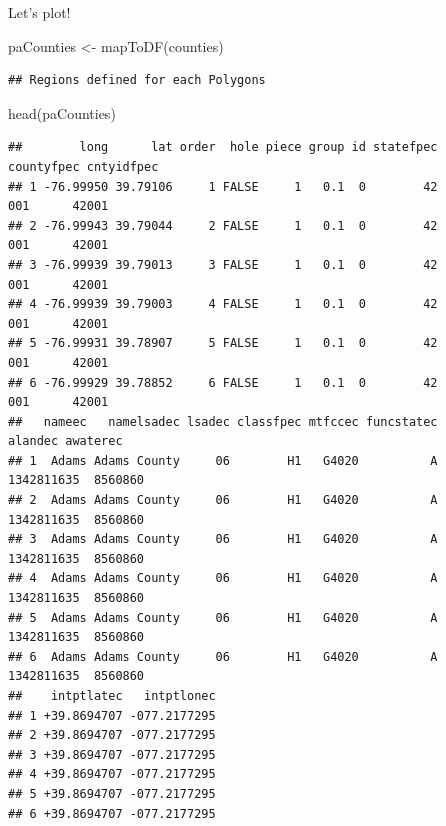 \documentclass[
  ignorenonframetext,
]{beamer}
\newenvironment{Shaded}{\begin{snugshade}}{\end{snugshade}}
\newcommand{\FunctionTok}[1]{\textcolor[rgb]{0.00,0.00,0.00}{#1}}
\newcommand{\NormalTok}[1]{#1}
\newcommand{\OtherTok}[1]{\textcolor[rgb]{0.56,0.35,0.01}{#1}}
\begin{document}
\begin{frame}[fragile]{Let's plot!}
\protect\hypertarget{lets-plot-1}{}
\tiny

\begin{Shaded}
\begin{Highlighting}[]
\NormalTok{paCounties }\OtherTok{\textless{}{-}} \FunctionTok{mapToDF}\NormalTok{(counties)}
\end{Highlighting}
\end{Shaded}

\begin{verbatim}
## Regions defined for each Polygons
\end{verbatim}

\begin{Shaded}
\begin{Highlighting}[]
\FunctionTok{head}\NormalTok{(paCounties)}
\end{Highlighting}
\end{Shaded}

\begin{verbatim}
##        long      lat order  hole piece group id statefpec countyfpec cntyidfpec
## 1 -76.99950 39.79106     1 FALSE     1   0.1  0        42        001      42001
## 2 -76.99943 39.79044     2 FALSE     1   0.1  0        42        001      42001
## 3 -76.99939 39.79013     3 FALSE     1   0.1  0        42        001      42001
## 4 -76.99939 39.79003     4 FALSE     1   0.1  0        42        001      42001
## 5 -76.99931 39.78907     5 FALSE     1   0.1  0        42        001      42001
## 6 -76.99929 39.78852     6 FALSE     1   0.1  0        42        001      42001
##   nameec   namelsadec lsadec classfpec mtfccec funcstatec    alandec awaterec
## 1  Adams Adams County     06        H1   G4020          A 1342811635  8560860
## 2  Adams Adams County     06        H1   G4020          A 1342811635  8560860
## 3  Adams Adams County     06        H1   G4020          A 1342811635  8560860
## 4  Adams Adams County     06        H1   G4020          A 1342811635  8560860
## 5  Adams Adams County     06        H1   G4020          A 1342811635  8560860
## 6  Adams Adams County     06        H1   G4020          A 1342811635  8560860
##    intptlatec   intptlonec
## 1 +39.8694707 -077.2177295
## 2 +39.8694707 -077.2177295
## 3 +39.8694707 -077.2177295
## 4 +39.8694707 -077.2177295
## 5 +39.8694707 -077.2177295
## 6 +39.8694707 -077.2177295
\end{verbatim}
\end{frame}
\end{document}
